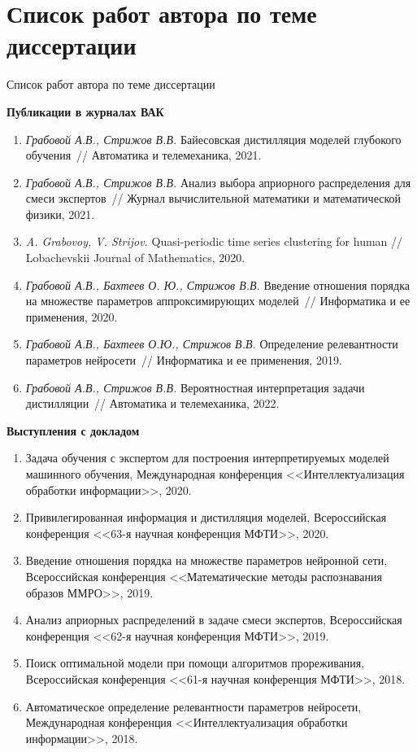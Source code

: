 \documentclass[10pt,pdf,hyperref={unicode}]{beamer}
\begin{document}
\section{Список работ автора по теме диссертации}
\begin{frame}{Список работ автора по теме диссертации}
\justifying
{
\scriptsize
\textbf{Публикации в журналах ВАК}

\begin{enumerate}
    \item \textit{Грабовой А.В., Стрижов В.В.} Байесовская дистилляция моделей глубокого обучения~// Автоматика и телемеханика, 2021.
    \item \textit{Грабовой А.В., Стрижов В.В.} Анализ выбора априорного распределения для смеси экспертов~// Журнал вычислительной математики и математической физики, 2021.
    \item \textit{A. Grabovoy, V. Strijov.} Quasi-periodic time series clustering for human // Lobachevskii Journal of Mathematics, 2020.
    \item \textit{Грабовой А.В., Бахтеев О. Ю., Стрижов В.В.} Введение отношения порядка на множестве параметров аппроксимирующих моделей~// Информатика и ее применения, 2020.
    \item \textit{Грабовой А.В., Бахтеев О.Ю., Стрижов В.В.} Определение релевантности параметров нейросети~// Информатика и ее применения, 2019.
    \item \textit{Грабовой А.В., Стрижов В.В.} Вероятностная интерпретация задачи дистилляции~// Автоматика и телемеханика, 2022.
\end{enumerate}

\textbf{Выступления с докладом}
\begin{enumerate}
    \item Задача обучения с экспертом для построения интерпретируемых моделей машинного обучения, Международная конференция <<Интеллектуализация обработки информации>>, 2020.
    \item Привилегированная информация и дистилляция моделей, Всероссийская конференция <<63-я научная конференция МФТИ>>, 2020.
    \item Введение отношения порядка на множестве параметров нейронной сети, Всероссийская конференция <<Математические методы распознавания образов ММРО>>, 2019.
    \item Анализ априорных распределений в задаче смеси экспертов, Всероссийская конференция <<62-я научная конференция МФТИ>>, 2019.
    \item Поиск оптимальной модели при помощи алгоритмов прореживания, Всероссийская конференция <<61-я научная конференция МФТИ>>, 2018.
    \item Автоматическое определение релевантности параметров нейросети, Международная конференция <<Интеллектуализация обработки информации>>, 2018.
\end{enumerate}
}
\end{frame}
\end{document}
